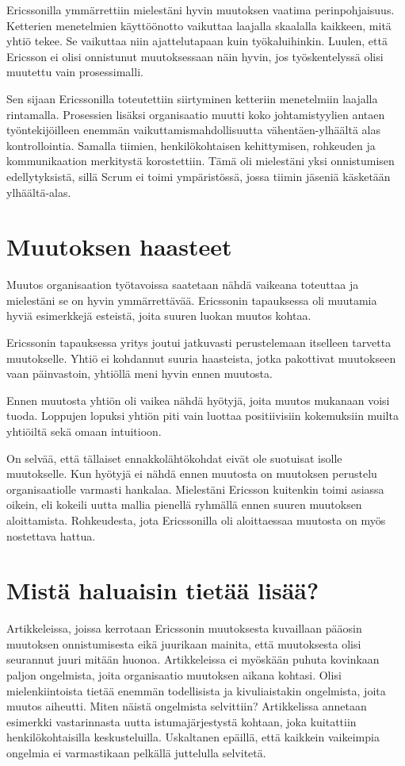 \documentclass[a4paper]{article}
\begin{document}
Ericssonilla ymmärrettiin mielestäni hyvin muutoksen vaatima perinpohjaisuus. Ketterien menetelmien käyttöönotto vaikuttaa laajalla skaalalla kaikkeen, mitä yhtiö tekee. Se vaikuttaa niin ajattelutapaan kuin työkaluihinkin. Luulen, että Ericsson ei olisi onnistunut muutoksessaan näin hyvin, jos työskentelyssä olisi muutettu vain prosessimalli.

Sen sijaan Ericssonilla toteutettiin siirtyminen ketteriin menetelmiin laajalla rintamalla. Prosessien lisäksi organisaatio muutti koko johtamistyylien antaen työntekijöilleen enemmän vaikuttamismahdollisuutta vähentäen-ylhäältä alas kontrollointia. Samalla tiimien, henkilökohtaisen kehittymisen, rohkeuden ja kommunikaation merkitystä korostettiin. Tämä oli mielestäni yksi onnistumisen edellytyksistä, sillä Scrum ei toimi ympäristössä, jossa tiimin jäseniä käsketään ylhäältä-alas.

\section{Muutoksen haasteet}

Muutos organisaation työtavoissa saatetaan nähdä vaikeana toteuttaa ja mielestäni se on hyvin ymmärrettävää. Ericssonin tapauksessa oli muutamia hyviä esimerkkejä esteistä, joita suuren luokan muutos kohtaa.

Ericssonin tapauksessa yritys joutui jatkuvasti perustelemaan itselleen tarvetta muutokselle. Yhtiö ei kohdannut suuria haasteista, jotka pakottivat muutokseen vaan päinvastoin, yhtiöllä meni hyvin ennen muutosta. \citep{mikkonen2011}

Ennen muutosta yhtiön oli vaikea nähdä hyötyjä, joita muutos mukanaan voisi tuoda. Loppujen lopuksi yhtiön piti vain luottaa positiivisiin kokemuksiin muilta yhtiöiltä sekä omaan intuitioon.

On selvää, että tällaiset ennakkolähtökohdat eivät ole suotuisat isolle muutokselle. Kun hyötyjä ei nähdä ennen muutosta on muutoksen perustelu organisaatiolle varmasti hankalaa. Mielestäni Ericsson kuitenkin toimi asiassa oikein, eli kokeili uutta mallia pienellä ryhmällä ennen suuren muutoksen aloittamista. Rohkeudesta, jota Ericssonilla oli aloittaessaa muutosta on myös nostettava hattua.

\section{Mistä haluaisin tietää lisää?}

Artikkeleissa, joissa kerrotaan Ericssonin muutoksesta \citep{mikkonen2011} \citep{hallikainen2012} kuvaillaan pääosin muutoksen onnistumisesta eikä juurikaan mainita, että muutoksesta olisi seurannut juuri mitään huonoa. Artikkeleissa ei myöskään puhuta kovinkaan paljon ongelmista, joita organisaatio muutoksen aikana kohtasi. Olisi mielenkiintoista tietää enemmän todellisista ja kivuliaistakin ongelmista, joita muutos aiheutti. Miten näistä ongelmista selvittiin? Artikkelissa annetaan esimerkki vastarinnasta uutta istumajärjestystä kohtaan, joka kuitattiin henkilökohtaisilla keskusteluilla. Uskaltanen epäillä, että kaikkein vaikeimpia ongelmia ei varmastikaan pelkällä juttelulla selvitetä.
\end{document}

